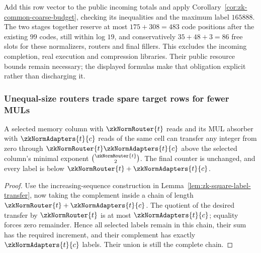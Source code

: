 Add this row vector to the public incoming totals and apply Corollary~\ref{cor:zk-common-coarse-budget}, checking its inequalities and the maximum label $165888$. The two stages together reserve at most $175+308=483$ code positions after the existing $99$ codes, still within log $19$, and conservatively $35+48+3=86$ free slots for these normalizers, routers and final fillers. This excludes the incoming completion, real execution and compression libraries. Their public resource bounds remain necessary; the displayed formulas make that obligation explicit rather than discharging it.

\subsubsection{Unequal-size routers trade spare target rows for fewer MULs}

\begin{lemma}\label{lem:zk-rectangular-count-transfer}
A selected memory column with $\zkNormRouter{t}$ reads and its MUL absorber with $\zkNormAdapters{t}{c}$ reads of the same cell can transfer any integer from zero through $\zkNormRouter{t}\zkNormAdapters{t}{c}$ above the selected column's minimal exponent $\binom{\zkNormRouter{t}}2$. The final counter is unchanged, and every label is below $\zkNormRouter{t}+\zkNormAdapters{t}{c}$.
\end{lemma}
\begin{proof}
Use the increasing-sequence construction in Lemma~\ref{lem:zk-square-label-transfer}, now taking the complement inside a chain of length $\zkNormRouter{t}+\zkNormAdapters{t}{c}$. The quotient of the desired transfer by $\zkNormRouter{t}$ is at most $\zkNormAdapters{t}{c}$; equality forces zero remainder. Hence all selected labels remain in this chain, their sum has the required increment, and their complement has exactly $\zkNormAdapters{t}{c}$ labels. Their union is still the complete chain.
\end{proof}

